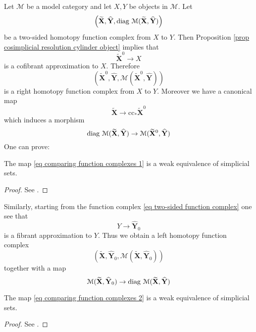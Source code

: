 \begin{refsection}
Let $\mathcal M$ be a model category and let $X,Y$ be objects in $\mathcal M$. Let
\begin{equation} \label{eq two-sided function complex}
\left( \widetilde{\mathbf X}, \widehat{\mathbf Y}, \operatorname{\mathrm{diag} \,} \mathcal M ( \widetilde{\mathbf X}, \widehat{\mathbf Y}) \right)
\end{equation}
be a two-sided homotopy function complex from $X$ to $Y$. Then Proposition \ref{prop cosimplicial resolution cylinder object} implies that
\[
\widetilde{\mathbf X}^0 \to X
\]
is a cofibrant approximation to $X$. Therefore
\[
\left(\widetilde{\mathbf X}^0, \widehat{\mathbf Y}, \mathcal M( \widetilde{\mathbf X}^0, \widehat{\mathbf Y}) \right)
\]
is a right homotopy function complex from $X$ to $Y$. Moreover we have a canonical map
\[
\widetilde{\mathbf X} \to \mathrm{cc}_* \widetilde{\mathbf X}^0
\]
which induces a morphism
\begin{equation} \label{eq comparing function complexes 1}
\operatorname{\mathrm{diag} \,} \mathcal M (\widetilde{\mathbf X}, \widehat{\mathbf Y}) \to \mathcal M(\widetilde{\mathbf X}^0, \widehat{\mathbf Y})
\end{equation}
One can prove:

\begin{thm}
The map \eqref{eq comparing function complexes 1} is a weak equivalence of simplicial sets.
\end{thm}

\begin{proof}
See \cite[Proposition 17.4.6]{hirschhorn}.
\end{proof}

Similarly, starting from the function complex \eqref{eq two-sided function complex} one see that
\[
Y \to \widehat{\mathbf Y}_0
\]
is a fibrant approximation to $Y$. Thus we obtain a left homotopy function complex
\[
\left( \widetilde{\mathbf X}, \widehat{\mathbf Y}_0, \mathcal M( \widetilde{\mathbf X}, \widehat{\mathbf Y}_0) \right)
\]
together with a map
\begin{equation} \label{eq comparing function complexes 2}
\mathcal M( \widetilde{\mathbf X}, \widehat{\mathbf Y}_0) \to \operatorname{\mathrm{diag} \,} \mathcal M(\widetilde{\mathbf X}, \widehat{\mathbf Y})
\end{equation}

\begin{thm}
The map \eqref{eq comparing function complexes 2} is a weak equivalence of simplicial sets.
\end{thm}

\begin{proof}
See \cite[Proposition 17.4.6]{hirschhorn}.
\end{proof}


\end{refsection}
